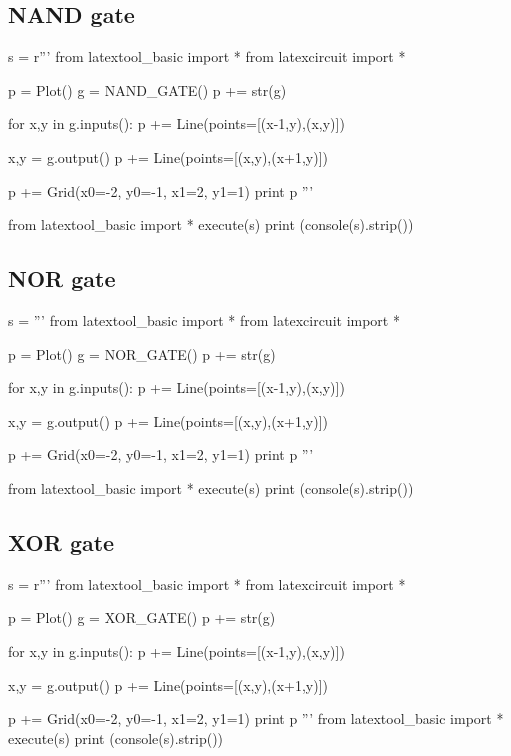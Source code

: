 \newpage
\subsection{NAND gate}

\begin{python}
s = r'''
from latextool_basic import *
from latexcircuit import *

p = Plot()
g = NAND_GATE()
p += str(g)

for x,y in g.inputs():
    p += Line(points=[(x-1,y),(x,y)])

x,y = g.output()
p += Line(points=[(x,y),(x+1,y)])

p += Grid(x0=-2, y0=-1, x1=2, y1=1)
print p
'''

from latextool_basic import *
execute(s)
print (console(s).strip())
\end{python}



\newpage
\subsection{NOR gate}
\begin{python}
s = '''
from latextool_basic import *
from latexcircuit import *

p = Plot()
g = NOR_GATE()
p += str(g)

for x,y in g.inputs():
    p += Line(points=[(x-1,y),(x,y)])

x,y = g.output()
p += Line(points=[(x,y),(x+1,y)])

p += Grid(x0=-2, y0=-1, x1=2, y1=1)
print p
'''

from latextool_basic import *
execute(s)
print (console(s).strip())
\end{python}



\newpage
\subsection{XOR gate}
\begin{python}
s = r'''
from latextool_basic import *
from latexcircuit import *

p = Plot()
g = XOR_GATE()
p += str(g)

for x,y in g.inputs():
    p += Line(points=[(x-1,y),(x,y)])

x,y = g.output()
p += Line(points=[(x,y),(x+1,y)])

p += Grid(x0=-2, y0=-1, x1=2, y1=1)
print p
'''
from latextool_basic import *
execute(s)
print (console(s).strip())
\end{python}



